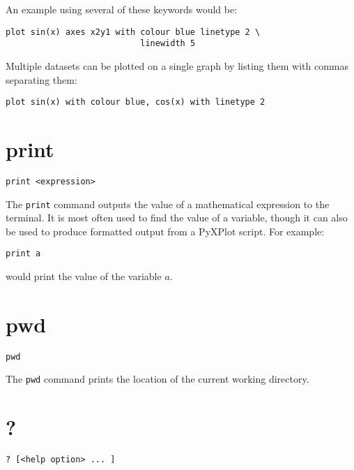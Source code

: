 \documentclass[a4paper,onecolumn,11pt]{book}
\begin{document}
An example using several of these keywords would be:

\begin{verbatim}
plot sin(x) axes x2y1 with colour blue linetype 2 \
                           linewidth 5
\end{verbatim}

Multiple datasets can be plotted on a single graph by listing them with commas
separating them:

\begin{verbatim}
plot sin(x) with colour blue, cos(x) with linetype 2
\end{verbatim}


\section{print}

\begin{verbatim}
print <expression>
\end{verbatim}

The {\tt print} command outputs the value of a mathematical expression to the
terminal.  It is most often used to find the value of a variable, though it can
also be used to produce formatted output from a PyXPlot script. For example:

\begin{verbatim}
print a
\end{verbatim}

\noindent would print the value of the variable $a$.


\section{pwd}

\begin{verbatim}
pwd
\end{verbatim}

The {\tt pwd} command prints the location of the current working directory.


\section{?}

\begin{verbatim}
? [<help option> ... ]
\end{verbatim}
\end{document}
